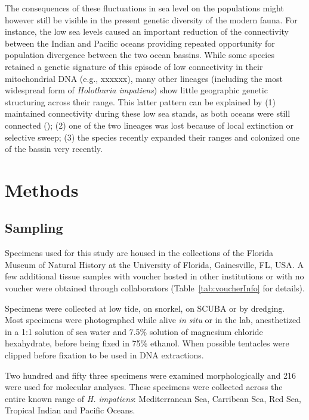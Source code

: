 \documentclass{article}
\begin{document}
The consequences of these fluctuations in sea level on the populations might
however still be visible in the present genetic diversity of the modern
fauna. For instance, the low sea levels caused an important reduction of the
connectivity between the Indian and Pacific oceans providing repeated
opportunity for population divergence between the two ocean bassins. While some
species retained a genetic signature of this episode of low connectivity in
their mitochondrial DNA (e.g., xxxxxx), many other lineages (including the most
widespread form of \textit{Holothuria impatiens}) show little geographic genetic
structuring across their range. This latter pattern can be explained by (1)
maintained connectivity during these low sea stands, as both oceans were still
connected (\cite{Voris2000}); (2) one of the two lineages was lost because of
local extinction or selective sweep; (3) the species recently expanded their
ranges and colonized one of the bassin very recently.




\section{Methods}

\subsection{Sampling}

Specimens used for this study are housed in the collections of the Florida
Museum of Natural History at the University of Florida, Gainesville, FL, USA. A
few additional tissue samples with voucher hosted in other institutions or with
no voucher were obtained through collaborators (Table~\ref{tab:voucherInfo} for
details).

Specimens were collected at low tide, on snorkel, on SCUBA or by dredging. Most
specimens were photographed while alive \textit{in situ} or in the lab,
anesthetized in a 1:1 solution of sea water and 7.5\% solution of magnesium
chloride hexahydrate, before being fixed in 75\% ethanol. When possible
tentacles were clipped before fixation to be used in DNA extractions.

Two hundred and fifty three specimens were examined morphologically and 216 were
used for molecular analyses. These specimens were collected across the entire
known range of \textit{H. impatiens}: Mediterranean Sea, Carribean Sea, Red Sea,
Tropical Indian and Pacific Oceans.
\end{document}
